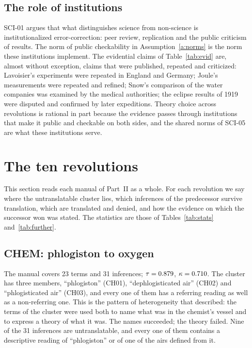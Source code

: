 \documentclass{situationist-preprint}
\begin{document}
\subsection{The role of institutions}

SCI-01 argues that what distinguishes science from non-science is institutionalized error-correction: peer review, replication and the public criticism of results. The norm of public checkability in Assumption~\ref{a:norms} is the norm these institutions implement. The evidential claims of Table~\ref{tab:evid} are, almost without exception, claims that were published, repeated and criticized: Lavoisier's experiments were repeated in England and Germany; Joule's measurements were repeated and refined; Snow's comparison of the water companies was examined by the medical authorities; the eclipse results of 1919 were disputed and confirmed by later expeditions. Theory choice across revolutions is rational in part because the evidence passes through institutions that make it public and checkable on both sides, and the shared norms of SCI-05 are what these institutions serve.

\section{The ten revolutions}\label{s:revolutions}

This section reads each manual of Part~II as a whole. For each revolution we say where the untranslatable cluster lies, which inferences of the predecessor survive translation, which are translated and denied, and how the evidence on which the successor won was stated. The statistics are those of Tables~\ref{tab:stats} and~\ref{tab:further}.

\subsection{CHEM: phlogiston to oxygen}

The manual covers 23 terms and 31 inferences; $\tau = 0.879$, $\kappa = 0.710$. The cluster has three members, \enquote{phlogiston} (CH01), \enquote{dephlogisticated air} (CH02) and \enquote{phlogisticated air} (CH03), and every one of them has a referring reading as well as a non-referring one. This is the pattern of heterogeneity that \citet{Kitcher1978} described: the terms of the cluster were used both to name what was in the chemist's vessel and to express a theory of what it was. The names succeeded; the theory failed. Nine of the 31 inferences are untranslatable, and every one of them contains a descriptive reading of \enquote{phlogiston} or of one of the airs defined from it.
\end{document}
